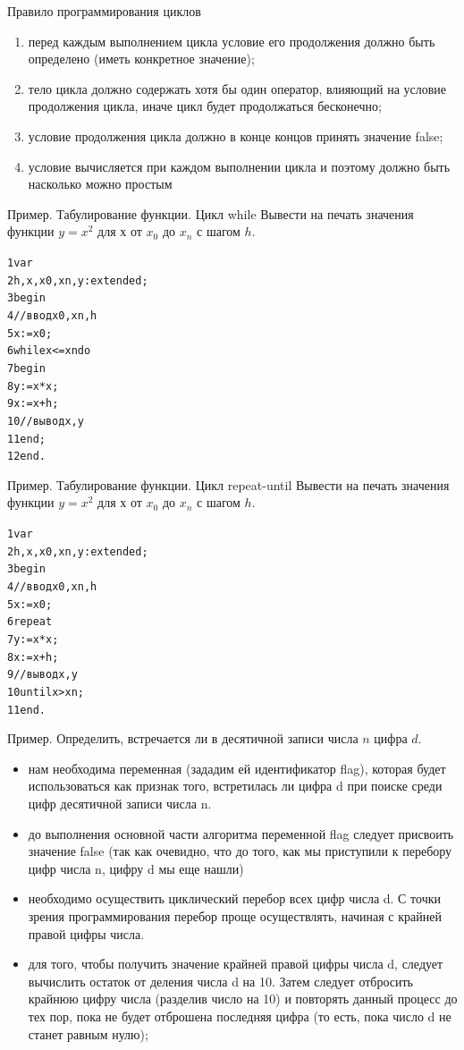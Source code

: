 \documentclass{beamer}
\begin{document}
\begin{frame}{Правило программирования циклов}
\begin{enumerate}
\item перед каждым выполнением цикла условие его продолжения должно быть определено (иметь конкретное значение);
\item тело цикла должно содержать хотя бы один оператор, влияющий на условие продолжения цикла, иначе цикл будет продолжаться бесконечно;
\item условие продолжения цикла должно в конце концов принять значение false;
\item условие вычисляется при каждом выполнении цикла и поэтому должно быть насколько можно простым
\end{enumerate}
\end{frame}

\begin{frame}{Пример. Табулирование функции. Цикл while}
Вывести на печать значения функции $y = x^2$ для $х$ от $x_0$ до $x_n$ с шагом $h$. 
\begin{alltt}
1 var
2   h, x, x0, xn, y: extended; 
3 begin
4   //ввод x0, xn, h
5   x := x0;
6   while x <= xn do
7   begin
8     y := x * x;
9     x := x + h;
10    //вывод x, y
11  end; 
12 end.
\end{alltt}
\end{frame}

\begin{frame}{Пример. Табулирование функции. Цикл repeat-until}
Вывести на печать значения функции $y = x^2$ для $х$ от $x_0$ до $x_n$ с шагом $h$. 
\begin{alltt}
1 var
2   h, x, x0, xn, y: extended; 
3 begin
4   //ввод x0, xn, h
5   x := x0;
6   repeat 
7     y := x * x;
8     x := x + h;
9    //вывод x, y
10  until x > xn; 
11 end.
\end{alltt}
\end{frame}

\begin{frame}{Пример.}
Определить, встречается ли в десятичной записи числа $n$ цифра $d$.
\begin{itemize}
\item нам необходима переменная (зададим ей идентификатор flag), которая будет использоваться как признак того, встретилась ли цифра d при поиске среди цифр десятичной записи числа n.
\item до выполнения основной части алгоритма переменной flag следует присвоить значение false (так как очевидно, что до того, как мы приступили к перебору цифр числа n, цифру d мы еще нашли)
\item необходимо осуществить циклический перебор всех цифр числа d. С точки зрения программирования перебор проще осуществлять, начиная с крайней правой цифры числа. 
\item для того, чтобы получить значение крайней правой цифры числа d, следует вычислить остаток от деления числа d на 10. Затем следует отбросить крайнюю цифру числа (разделив число на 10) и повторять данный процесс до тех пор, пока не будет отброшена последняя цифра (то есть, пока число d не станет равным нулю);
\end{itemize}
\end{frame}
\end{document}
